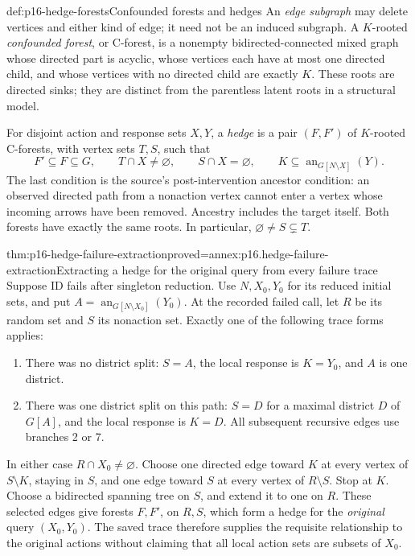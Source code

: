 \begin{hbdefinition}{def:p16-hedge-forests}{Confounded forests and hedges}
An \emph{edge subgraph} may delete vertices and either kind of edge;
it need not be an induced subgraph. A \(K\)-rooted
\emph{confounded forest}, or C-forest, is a nonempty bidirected-connected
mixed graph whose directed part is acyclic, whose vertices each have
at most one directed child, and whose vertices with no directed child
are exactly \(K\). These roots are directed sinks; they are distinct
from the parentless latent roots in a structural model.

For disjoint action and response sets \(X,Y\), a \emph{hedge}
is a pair \((F,F')\) of \(K\)-rooted C-forests, with vertex
sets \(T,S\), such that
\[
 F'\subseteq F\subseteq G,\qquad
 T\cap X\ne\varnothing,\qquad S\cap X=\varnothing,\qquad
 K\subseteq\operatorname{an}_{G[N\setminus X]}(Y).
\]
The last condition is the source's post-intervention ancestor condition:
an observed directed path from a nonaction vertex cannot enter a vertex
whose incoming arrows have been removed. Ancestry includes the target
itself. Both forests have exactly the same roots. In particular,
\(\varnothing\ne S\subsetneq T\).
\end{hbdefinition}

\begin{hbtheorem}{thm:p16-hedge-failure-extraction}{proved=annex:p16.hedge-failure-extraction}{Extracting a hedge for the original query from every failure trace}
Suppose ID fails after singleton reduction. Use \(N,X_0,Y_0\)
for its reduced initial sets, and put
\(A=\operatorname{an}_{G[N\setminus X_0]}(Y_0)\).
At the recorded failed call, let \(R\) be its random set and
\(S\) its nonaction set. Exactly one of the following trace forms
applies:
\begin{enumerate}
\item There was no district split: \(S=A\), the local response is
      \(K=Y_0\), and \(A\) is one district.
\item There was one district split on this path: \(S=D\) for a
      maximal district \(D\) of \(G[A]\), and the local response
      is \(K=D\). All subsequent recursive edges use branches 2 or 7.
\end{enumerate}
In either case \(R\cap X_0\ne\varnothing\).
Choose one directed edge toward \(K\) at every vertex of
\(S\setminus K\), staying in \(S\), and one edge toward
\(S\) at every vertex of \(R\setminus S\). Stop at \(K\).
Choose a bidirected spanning tree on \(S\), and extend it to one
on \(R\). These selected edges give forests \(F,F'\), on
\(R,S\), which form a hedge for the \emph{original} query
\((X_0,Y_0)\). The saved trace therefore supplies the requisite
relationship to the original actions without claiming that all local
action sets are subsets of \(X_0\).
\end{hbtheorem}

